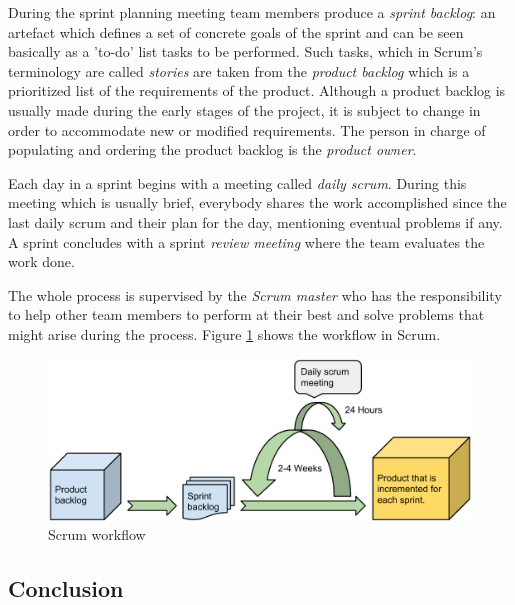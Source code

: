 During the sprint planning meeting team members produce a \emph{sprint backlog}: an artefact which defines a
set of concrete goals of the sprint and can be seen basically as a 'to-do' list tasks to be performed.
Such tasks, which in Scrum's terminology are called \emph{stories} are taken from the \emph{product backlog} which
is a prioritized list of the requirements of the product. Although a product backlog is usually made during the early
stages of the project, it is subject to change in order to accommodate new or modified requirements. 
The person in charge of populating and ordering the product backlog is the \emph{product owner}.

Each day in a sprint begins with a meeting called \emph{daily scrum}. 
During this meeting which is usually brief, everybody shares the work accomplished since the last daily
scrum and their plan for the day, mentioning eventual problems if any. 
A sprint concludes with a sprint \textit{review meeting} where the team evaluates the work done.

The whole process is supervised by the \textit{Scrum master} who has the responsibility to
help other team members to perform at their best and solve problems that might arise during the process.
Figure \ref{figure:scrum-workflow} shows the workflow in Scrum. \cite{Compendium}

\begin{figure}[h]
\begin{center}
\includegraphics[scale=0.5]{../Figures/Scrum-workflow.pdf}
\end{center}
\caption{Scrum workflow}
\label{figure:scrum-workflow}
\end{figure}

\subsection{Conclusion}
\label{subsec:devprocess}

